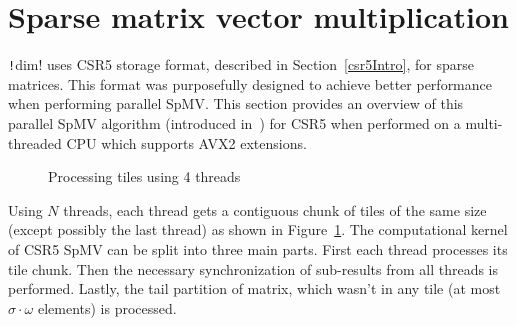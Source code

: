 \documentclass[thesis=M,english]{FITthesis}[2019/12/23]
\newcommand{\csre}[1]{\texttt!#1!}
\begin{document}
\vfil
\pagebreak

\section{Sparse matrix vector multiplication}\label{csr5:spmv}


\csre{dim} uses CSR5 storage format, described in Section~\ref{csr5Intro}, for sparse matrices. This format was purposefully
designed to achieve better performance when performing parallel SpMV\@. This section provides an overview
of this parallel SpMV algorithm (introduced in~\cite{liu2015csr5}) for CSR5 when performed on a multi-threaded
CPU which supports AVX2 extensions.

\begin{figure}[htp]
    \centering
    \caption{Processing tiles using 4 threads}\label{csr5:thr_dist}
\end{figure}

Using \(N\) threads, each thread gets a contiguous chunk of tiles of the same size (except possibly the
last thread) as shown in Figure~\ref{csr5:thr_dist}. The computational kernel of CSR5 SpMV can be split into three main parts. First each thread processes
its tile chunk. Then the necessary synchronization of sub-results from all threads is performed.
Lastly, the tail partition of matrix, which wasn't in any tile (at most \(\sigma{} \cdot \omega\) elements)
is processed.
\end{document}
